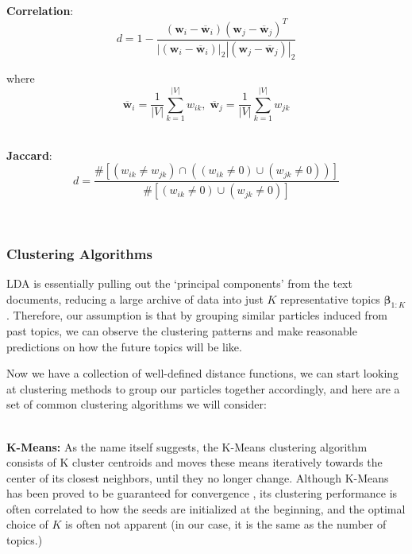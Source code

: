 \documentclass[conference]{IEEEtran}
\begin{document}
\-\\
\textbf{Correlation}: 
\begin{equation*}
d = 1 - \frac{(\mathbf{w}_i - \overline{\mathbf{w}}_i)(\mathbf{w}_j - \overline{\mathbf{w}}_j)^T}{|(\mathbf{w}_i - \overline{\mathbf{w}}_i)|_2|(\mathbf{w}_j - \overline{\mathbf{w}}_j)|_2}
\end{equation*}

where 
\begin{equation*}
	\overline{\mathbf{w}}_i = \frac{1}{|V|}\sum_{k=1}^{|V|}w_{ik},\;
	\overline{\mathbf{w}}_j = \frac{1}{|V|}\sum_{k=1}^{|V|}w_{jk}
\end{equation*}

\-\\
\textbf{Jaccard}: 
\begin{equation*}
	d = \frac{\# \left[(w_{ik} \neq w_{jk})\cap((w_{ik} \neq 0)\cup(w_{jk} \neq 0))\right]}{\#\left[(w_{ik} \neq 0)\cup(w_{jk} \neq 0)\right]}
\end{equation*}

\-\\

\subsubsection{Clustering Algorithms}
LDA is essentially pulling out the `principal components' from the text documents, reducing a large archive of data into just $K$ representative topics $\mathbf{\beta}_{1:K}$. Therefore, our assumption is that by grouping similar particles induced from past topics, we can observe the clustering patterns and make reasonable predictions on how the future topics will be like.

Now we have a collection of well-defined distance functions, we can start looking at clustering methods to group our particles together accordingly, and here are a set of common clustering algorithms we will consider:

\-\\
\textbf{K-Means:} As the name itself suggests, the K-Means clustering algorithm consists of K cluster centroids and moves these means iteratively towards the center of its closest neighbors, until they no longer change. Although K-Means has been proved to be guaranteed for convergence \cite{selim1984}, its clustering performance is often correlated to how the seeds are initialized at the beginning, and the optimal choice of $K$ is often not apparent (in our case, it is the same as the number of topics.)
\end{document}
